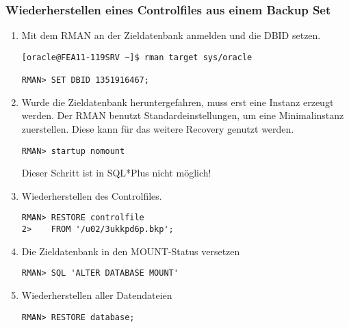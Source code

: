         \subsubsection{Wiederherstellen eines Controlfiles aus einem Backup Set}
          \begin{enumerate}
            \item Mit dem RMAN an der Zieldatenbank anmelden und die DBID setzen.
              \begin{lstlisting}[caption={An der Zieldatenbank anmelden und die DBID setzen},label=admin1524,language=rman]
[oracle@FEA11-119SRV ~]$ rman target sys/oracle

RMAN> SET DBID 1351916467;
                  \end{lstlisting}
            \item Wurde die Zieldatenbank heruntergefahren, muss erst eine Instanz erzeugt werden. Der RMAN benutzt Standardeinstellungen, um eine Minimalinstanz zuerstellen. Diese kann f\"ur das weitere Recovery genutzt werden.
              \begin{lstlisting}[caption={Zieldatenbank im RMAN in den NOMOUNT-Status bringen},label=admin1525,language=rman,alsolanguage=sqlplus]
RMAN> startup nomount
              \end{lstlisting}
              \begin{merke}
                Dieser Schritt ist in SQL*Plus nicht m\"oglich!
              \end{merke}
            \item Wiederherstellen des Controlfiles.
              \begin{lstlisting}[caption={Wiederherstellen des Controlfiles},label=admin1526,language=rman]
RMAN> RESTORE controlfile
2>    FROM '/u02/3ukkpd6p.bkp';
              \end{lstlisting}
            \item Die Zieldatenbank in den MOUNT-Status versetzen
              \begin{lstlisting}[caption={Zieldatenbank mounten},label=admin1527,language=rman,emph={[9]ALTER,DATABASE,MOUNT},emphstyle={[9]\color{magenta}\bfseries}]
RMAN> SQL 'ALTER DATABASE MOUNT'
              \end{lstlisting}
            \item Wiederherstellen aller Datendateien
              \begin{lstlisting}[caption={Datendateien wiederherstellen},label=admin1528,language=rman]
RMAN> RESTORE database;
              \end{lstlisting}

\end{enumerate}
